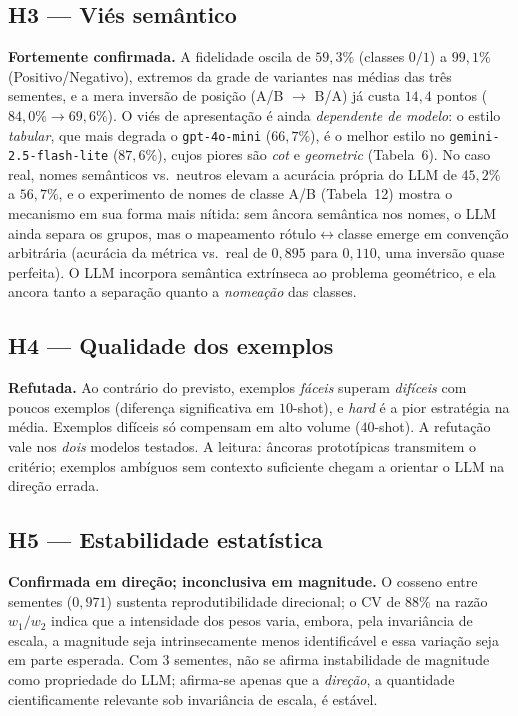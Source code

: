 \documentclass[12pt,a4paper]{article}
\begin{document}
\subsection{H3 — Viés semântico}
\textbf{Fortemente confirmada.} A fidelidade oscila de $59{,}3\%$ (classes $0/1$) a
$99{,}1\%$ (Positivo/Negativo), extremos da grade de variantes nas médias das três
sementes, e a
mera inversão de posição (A/B $\to$ B/A) já custa $14{,}4$ pontos ($84{,}0\% \to 69{,}6\%$).
O viés de apresentação é ainda \emph{dependente de modelo}: o estilo \emph{tabular}, que
mais degrada o \texttt{gpt-4o-mini} ($66{,}7\%$), é o melhor estilo no
\texttt{gemini-2.5-flash-lite} ($87{,}6\%$), cujos piores são \emph{cot} e
\emph{geometric} (Tabela~6).
No caso real, nomes semânticos vs.\ neutros elevam a acurácia própria do LLM de $45{,}2\%$ a
$56{,}7\%$, e o experimento de nomes de classe A/B (Tabela~12) mostra o
mecanismo em sua forma mais nítida: sem âncora semântica nos nomes, o LLM ainda separa os
grupos, mas o mapeamento rótulo$\leftrightarrow$classe emerge em convenção arbitrária
(acurácia da métrica vs.\ real de $0{,}895$ para $0{,}110$, uma inversão quase perfeita).
O LLM incorpora semântica extrínseca ao problema geométrico, e ela ancora tanto a
separação quanto a \emph{nomeação} das classes.

\subsection{H4 — Qualidade dos exemplos}
\textbf{Refutada.} Ao contrário do previsto, exemplos \emph{fáceis} superam \emph{difíceis}
com poucos exemplos (diferença significativa em $10$-shot), e \emph{hard} é a pior
estratégia na média. Exemplos difíceis só compensam em alto volume ($40$-shot). A refutação
vale nos \emph{dois} modelos testados. A leitura: âncoras prototípicas transmitem o critério;
exemplos ambíguos sem contexto suficiente chegam a orientar o LLM na direção errada.

\subsection{H5 — Estabilidade estatística}
\textbf{Confirmada em direção; inconclusiva em magnitude.} O cosseno entre sementes
($0{,}971$) sustenta reprodutibilidade direcional; o CV de $88\%$ na razão $w_1/w_2$ indica
que a intensidade dos pesos varia, embora, pela invariância de escala, a magnitude seja
intrinsecamente menos identificável e essa variação seja em parte esperada. Com $3$ sementes,
não se afirma instabilidade de magnitude como propriedade do LLM; afirma-se apenas que a
\emph{direção}, a quantidade cientificamente relevante sob invariância de escala, é estável.
\end{document}
